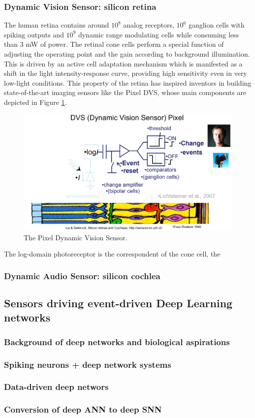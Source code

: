 \documentclass[main]{subfiles}
\begin{document}
\subsubsection{Dynamic Vision Sensor: silicon retina}
The human retina contains around $10^8$ analog receptors, $10^6$ ganglion cells with spiking outputs and $10^9$ dynamic range modulating cells while consuming less than 3 mW of power. The retinal cone cells perform a special function of adjusting the operating point and the gain according to background illumination. This is driven by an active cell adaptation mechanism which is manifested as a shift in the light intensity-response curve, providing high sensitivity even in very low-light conditions. This property of the retina has inspired inventors in building state-of-the-art imaging sensors like the Pixel DVS, whose main components are depicted in Figure \ref{fig:dvs}.
%
\begin{figure}[h]
    \centering
    \includegraphics[width=0.8\linewidth]{11_NeuromorphicSystems1/figures/DVS.PNG}
    \caption{The Pixel Dynamic Vision Sensor.}
    \label{fig:dvs}
\end{figure}
%
The log-domain photoreceptor is the correspondent of the cone cell, the 
\subsubsection{Dynamic Audio Sensor: silicon cochlea}
\subsection{Sensors driving event-driven Deep Learning networks}
\subsubsection{Background of deep networks and biological aspirations}
\subsubsection{Spiking neurons + deep network systems}
\subsubsection{Data-driven deep networs}
\subsubsection{Conversion of deep ANN to deep SNN}
\end{document}
